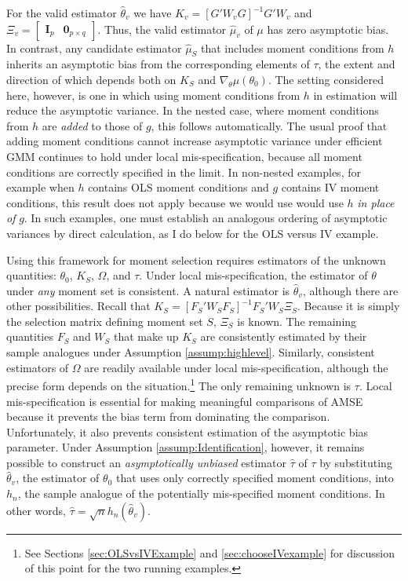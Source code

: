 For the valid estimator $\widehat{\theta}_v$ we have $K_v = \left[G'W_{v}G\right]^{-1}G' W_{v}$ and $\Xi_v =\left[\begin{array}{cc} \mathbf{I}_p& \mathbf{0}_{p\times q} \end{array} \right]$. 
Thus, the valid estimator $\widehat{\mu}_v$ of $\mu$ has zero asymptotic bias. 
In contrast, any candidate estimator $\widehat{\mu}_S$ that includes moment conditions from $h$ inherits an asymptotic bias from the corresponding elements of $\tau$, the extent and direction of which depends both on $K_S$ and $\nabla_\theta\mu(\theta_0)$. 
The setting considered here, however, is one in which using moment conditions from $h$ in estimation will reduce the asymptotic variance.
In the nested case, where moment conditions from $h$ are \emph{added} to those of $g$, this follows automatically.
The usual proof that adding moment conditions cannot increase asymptotic variance under efficient GMM \citep[see for example][ch.\ 6]{Hallbook} continues to hold under local mis-specification, because all moment conditions are correctly specified in the limit.
In non-nested examples, for example when $h$ contains OLS moment conditions and $g$ contains IV moment conditions, this result does not apply because we would use would use $h$ \emph{in place of} $g$.
In such examples, one must establish an analogous ordering of asymptotic variances by direct calculation, as I do below for the OLS versus IV example.

Using this framework for moment selection requires estimators of the unknown quantities: $\theta_0$, $K_S$, $\Omega$, and $\tau$. 
Under local mis-specification, the estimator of $\theta$ under \emph{any} moment set is consistent. 
A natural estimator is $\widehat{\theta}_v$, although there are other possibilities. 
Recall that $K_S = [F_S'W_SF_S]^{-1} F_S'W_S \Xi_S$.
Because it is simply the selection matrix defining moment set $S$, $\Xi_S$ is known.  
The remaining quantities $F_S$ and $W_S$ that make up $K_S$ are consistently estimated by their sample analogues under Assumption \ref{assump:highlevel}.
Similarly, consistent estimators of $\Omega$ are readily available under local mis-specification, although the precise form depends on the situation.\footnote{See Sections \ref{sec:OLSvsIVExample} and \ref{sec:chooseIVexample} for discussion of this point for the two running examples.}
The only remaining unknown is $\tau$. Local mis-specification is essential for making meaningful comparisons of AMSE because it prevents the bias term from dominating the comparison. 
Unfortunately, it also prevents consistent estimation of the asymptotic bias parameter.
Under Assumption \ref{assump:Identification}, however, it remains possible to construct an \emph{asymptotically unbiased} estimator $\widehat{\tau}$ of $\tau$ by substituting $\widehat{\theta}_v$, the estimator of $\theta_0$ that uses only correctly specified moment conditions, into $h_n$, the sample analogue of the potentially mis-specified moment conditions. 
In other words,  $\widehat{\tau} = \sqrt{n} h_n(\widehat{\theta}_v)$. 

